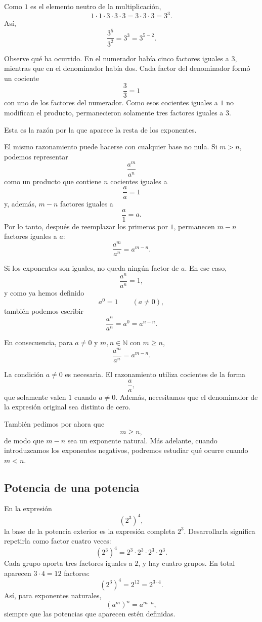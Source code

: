 Como \(1\) es el elemento neutro de la multiplicación,
\[
1\cdot1\cdot3\cdot3\cdot3
=
3\cdot3\cdot3
=
3^3.
\]
Así,
\[
\frac{3^5}{3^2}
=
3^3
=
3^{5-2}.
\]

Observe qué ha ocurrido. En el numerador había cinco factores iguales a \(3\), mientras que en el denominador había dos. Cada factor del denominador formó un cociente
\[
\frac33=1
\]
con uno de los factores del numerador. Como esos cocientes iguales a \(1\) no modifican el producto, permanecieron solamente tres factores iguales a \(3\).

Esta es la razón por la que aparece la resta de los exponentes.

El mismo razonamiento puede hacerse con cualquier base no nula. Si \(m>n\), podemos representar
\[
\frac{a^m}{a^n}
\]
como un producto que contiene \(n\) cocientes iguales a
\[
\frac aa=1
\]
y, además, \(m-n\) factores iguales a
\[
\frac a1=a.
\]
Por lo tanto, después de reemplazar los primeros por \(1\), permanecen \(m-n\) factores iguales a \(a\):
\[
\frac{a^m}{a^n}=a^{m-n}.
\]

Si los exponentes son iguales, no queda ningún factor de \(a\). En ese caso,
\[
\frac{a^n}{a^n}=1,
\]
y como ya hemos definido
\[
a^0=1
\qquad(a\ne0),
\]
también podemos escribir
\[
\frac{a^n}{a^n}=a^0=a^{n-n}.
\]

En consecuencia, para \(a\ne0\) y \(m,n\in\mathbb N\) con \(m\ge n\),
\[
\boxed{\frac{a^m}{a^n}=a^{m-n}}.
\]

La condición \(a\ne0\) es necesaria. El razonamiento utiliza cocientes de la forma
\[
\frac aa,
\]
que solamente valen \(1\) cuando \(a\ne0\). Además, necesitamos que el denominador de la expresión original sea distinto de cero.

También pedimos por ahora que
\[
m\ge n,
\]
de modo que \(m-n\) sea un exponente natural. Más adelante, cuando introduzcamos los exponentes negativos, podremos estudiar qué ocurre cuando \(m<n\).

\subsection{Potencia de una potencia}

En la expresión
\[
(2^3)^4,
\]
la base de la potencia exterior es la expresión completa \(2^3\). Desarrollarla significa repetirla como factor cuatro veces:
\[
(2^3)^4=2^3\cdot2^3\cdot2^3\cdot2^3.
\]
Cada grupo aporta tres factores iguales a \(2\), y hay cuatro grupos. En total aparecen \(3\cdot4=12\) factores:
\[
(2^3)^4=2^{12}=2^{3\cdot4}.
\]
Así, para exponentes naturales,
\[
(a^m)^n=a^{m\cdot n},
\]
siempre que las potencias que aparecen estén definidas.

